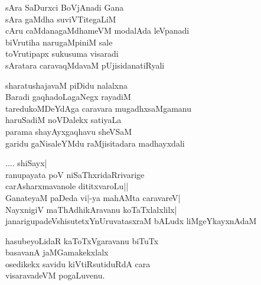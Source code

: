 \begin{entry}
\gl{}
\begin{shl}
sAra SaDurxci BoVjAnadi Gana\\
sAra gaMdha suviVTitegaLiM\\
cAru caMdanagaMdhameVM modalAda leVpanadi\\
biVrutiha narugaMpiniM sale\\
toVrutipapx sukusuma visaradi\\
sAratara caravaqMdavaM pUjisidanatiRyali
\end{shl}
\end{entry}

\begin{entry}
\gl{}
\begin{shl}
sharatushajavaM piDidu nalalxna\\
Baradi gaqhadoLagaNegx rayadiM\\
taredukoMDeYdAga caravara mugadhxsaMgamanu\\
haruSadiM noVDalekx satiyaLa\\
parama shayAyxgaqhavu sheVSaM\\
garidu gaNisaleYMdu raMjisitadara madhayxdali
\end{shl}
\end{entry}

\begin{entry}
\begin{shl}
.... shiSayx|\\
ranupayata poV niSaThxridaRrivarige\\
carAsharxmavanole dititxvaroLu||\\
GanateyaM paDeda vi|-ya mahAMta caravareV|\\
NayxnigiV maThAdhikAravanu koTaTxlalxlilx|\\
janarigupadeVshisutetxYnUruvatasxraM bALudx liMgeYkayxnAdaM
\end{shl}
\end{entry}

\begin{entry}
\gl{}
\begin{shl}
hasubeyoLidaR kaToTxVgaravanu biTuTx\\
basavanA jaMGamakekxlalx\\
osedikekx savidu kiVtiRsutiduRdA cara\\
visaravadeVM pogaLuvenu.
\end{shl}
\end{entry}

